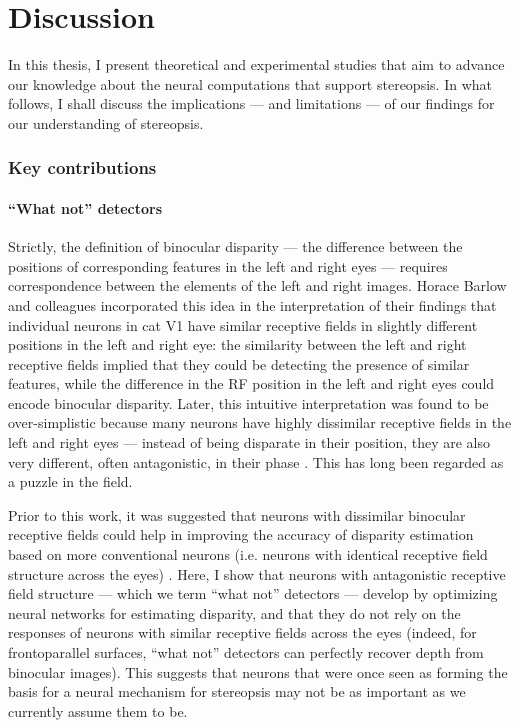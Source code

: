 \def\baselinestretch{1}
\chapter{Discussion}
\ifpdf
    \graphicspath{{discussion/discussion-figs/PNG/}{discussion/discussion-figs/PDF/}{discussion/discussion-figs/}}
\else
    \graphicspath{{discussion/discussion-figs/EPS/}{discussion/discussion-figs/}}
\fi

\def\baselinestretch{1.66}

In this thesis, I present theoretical and experimental studies that aim to advance our knowledge about the neural computations that support stereopsis. In what follows, I shall discuss the implications --- and limitations --- of our findings for our understanding of stereopsis.


\subsection{Key contributions}


\subsubsection*{``What not'' detectors}

Strictly, the definition of binocular disparity --- the difference between the positions of corresponding features in the left and right eyes --- requires correspondence between the elements of the left and right images. Horace Barlow and colleagues \cite{Barlow:1967bs} incorporated this idea in the interpretation of their findings that individual neurons in cat V1 have similar receptive fields in slightly different positions in the left and right eye: the similarity between the left and right receptive fields implied that they could be detecting the presence of similar features, while the difference in the RF position in the left and right eyes could encode binocular disparity. Later, this intuitive interpretation was found to be over-simplistic because many neurons have highly dissimilar receptive fields in the left and right eyes --- instead of being disparate in their position, they are also very different, often antagonistic, in their phase \cite{DeAngelis:1991mb}. This has long been regarded as a puzzle in the field.

Prior to this work, it was suggested that neurons with dissimilar binocular receptive fields could help in improving the accuracy of disparity estimation based on more conventional neurons (i.e. neurons with identical receptive field structure across the eyes) \cite{Read:2007nx}. Here, I show that neurons with antagonistic receptive field structure --- which we term ``what not'' detectors --- develop by optimizing neural networks for estimating disparity, and that they do not rely on the responses of neurons with similar receptive fields across the eyes (indeed, for frontoparallel surfaces, ``what not'' detectors can perfectly recover depth from binocular images). This suggests that neurons that were once seen as forming the basis for a neural mechanism for stereopsis \cite{Barlow:1967bs} may not be as important as we currently assume them to be.

